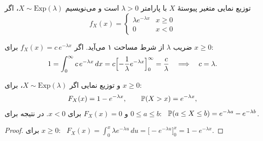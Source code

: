 \begin{definition}[label=def:exp]{توزیع نمایی}
متغیر پیوستهٔ $X$  با پارامتر $\lambda>0$ است و می‌نویسیم $X\sim\mathrm{Exp}(\lambda)$، اگر
\[ f_X(x)=\begin{cases}\lambda e^{-\lambda x} & x\ge0\\ 0 & x<0\end{cases} \]
\end{definition}

ضریب $\lambda$ از شرط مساحت ۱ می‌آید. اگر $f_X(x)=c\,e^{-\lambda x}$ برای $x\ge0$:
\[ 1=\int_0^\infty c\,e^{-\lambda x}\,dx=c\Bigl[-\frac1\lambda e^{-\lambda x}\Bigr]_0^\infty=\frac c\lambda\quad\Longrightarrow\quad c=\lambda. \]

\begin{proposition}[label=prop:exp-cdf]{ و  توزیع نمایی}
اگر $X\sim\mathrm{Exp}(\lambda)$، برای $x\ge0$:
\[ F_X(x)=1-e^{-\lambda x},\qquad \P(X>x)=e^{-\lambda x}, \]
و $F_X(x)=0$ برای $x<0$. در نتیجه برای $0\le a\le b$: \ $\P(a\le X\le b)=e^{-\lambda a}-e^{-\lambda b}$.
\end{proposition}

\begin{proof}
برای $x\ge0$: \ $F_X(x)=\int_0^x\lambda e^{-\lambda u}\,du=\bigl[-e^{-\lambda u}\bigr]_0^x=1-e^{-\lambda x}$.
\end{proof}

